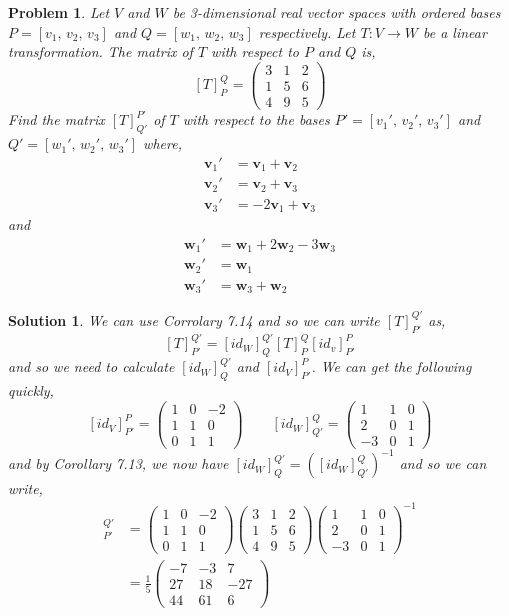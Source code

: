 \documentclass{article}
\renewcommand{\vec}[1]{\boldsymbol{\mathbf{#1}}}
\newcommand{\thbth}[9]{\begin{pmatrix} #1 & #2 & #3 \\ #4 & #5 & #6 \\ #7 & #8 & #9\end{pmatrix}}
\newtheorem{problem}{Problem}
\newtheorem{solution}{Solution}
\begin{document}
\newpage
\begin{problem}
  Let $V$ and $W$ be 3-dimensional real vector spaces with ordered bases $P = [v_1,\, v_2,\, v_3]$ and $Q = [w_1,\, w_2,\, w_3]$ respectively. Let $T : V \to W$ be a linear transformation. The matrix of $T$ with respect to $P$ and $Q$ is,
  $$ [T]_P^Q = \thbth 3 1 2 1 5 6 4 9 5 $$
  Find the matrix $[T]_{Q'}^{P'}$ of $T$ with respect to the bases $P' = [v_1',\, v_2',\, v_3']$ and $Q' = [w_1',\, w_2',\, w_3']$ where,
  \begin{align*}
    \vec v_1' &= \vec v_1 + \vec v_2\\
    \vec v_2' &= \vec v_2 + \vec v_3\\
    \vec v_3' &= -2\vec v_1 + \vec v_3
  \end{align*}
  and
  \begin{align*}
    \vec w_1' &= \vec w_1 + 2\vec w_2 - 3\vec w_3\\
    \vec w_2' &= \vec w_1\\
    \vec w_3' &= \vec w_3 + \vec w_2
  \end{align*}
\end{problem}
\begin{solution}
  We can use Corrolary 7.14 and so we can write $[T]_{P'}^{Q'}$ as,
  $$ [T]_{P'}^{Q'} = [id_W]_Q^{Q'}[T]_P^Q[id_v]_{P'}^P $$
  and so we need to calculate $[id_W]_Q^{Q'}$ and $[id_V]_{P'}^{P}$. We can get the following quickly,
  $$ [id_V]_{P'}^P = \thbth 1 0 {-2} 1 1 0 0 1 1 \qquad [id_W]_{Q'}^Q = \thbth 1 1 0 2 0 1 {-3} 0 1 $$
  and by Corollary 7.13, we now have $[id_W]_Q^{Q'} = ([id_W]_{Q'}^Q)^{-1}$ and so we can write,
  \begin{align*}
    [T]_{P'}^{Q'} &= \thbth 1 0 {-2} 1 1 0 0 1 1 \thbth 3 1 2 1 5 6 4 9 5 \thbth 1 1 0 2 0 1 {-3} 0 1 ^{-1} \\
    &= \frac{1}{5}\thbth {-7} {-3} 7 {27} {18} {-27} {44} {61} 6
  \end{align*}
\end{solution}
\end{document}
